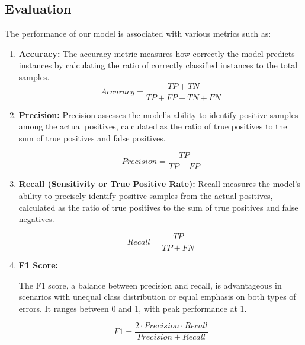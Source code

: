 \subsection{Evaluation}
The performance of our model is associated with various metrics such as: 
\begin{enumerate}
    \item \textbf{Accuracy:}
           The accuracy metric measures how correctly the model predicts instances by calculating the ratio of correctly classified instances to the total samples.
           \[ Accuracy = \frac{TP + TN}{TP + FP + TN + FN} \]
    
    \item \textbf{Precision:}
           Precision assesses the model's ability to identify positive samples among the actual positives, calculated as the ratio of true positives to the sum of true positives and false positives.

           \[ Precision = \frac{TP}{TP + FP} \]
    
    \item \textbf{Recall (Sensitivity or True Positive Rate):}
           Recall measures the model's ability to precisely identify positive samples from the actual positives, calculated as the ratio of true positives to the sum of true positives and false negatives.

           \[ Recall = \frac{TP}{TP + FN} \]
       
    
    \item \textbf{F1 Score:}
       
           The F1 score, a balance between precision and recall, is advantageous in scenarios with unequal class distribution or equal emphasis on both types of errors. It ranges between 0 and 1, with peak performance at 1.

           \[ F1 = \frac{2 \cdot Precision \cdot Recall}{Precision + Recall} \]
      
    \end{enumerate}
    
   
